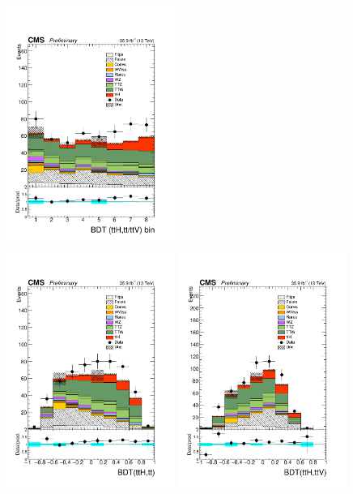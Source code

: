 \begin{figure}[htp]
\centering
\includegraphics[width=0.49\textwidth]{ch8_figs/final_shape_bdtv8__ttH_stackPlot_SR.pdf}\\
\includegraphics[width=0.49\textwidth]{ch8_figs/tt_BDT_BDTv8_ttH_stackPlot_SR.pdf}
\includegraphics[width=0.49\textwidth]{ch8_figs/ttV_BDT_ttH_stackPlot_SR.pdf}

\end{figure}
